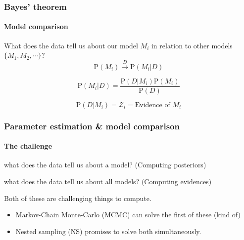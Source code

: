 \documentclass[]{beamer}
\newcommand{\ev}{\mathcal{Z}}
\newcommand{\prob}{\mathrm{P}}
\begin{document}
\begin{frame}
  \frametitle{Bayes' theorem}
  \framesubtitle{Model comparison}
  \pause
  What does the data tell us about our model $M_i$ in relation to other models $\{M_1,M_2,\cdots\}$?
  \pause
    \[\prob(M_i) \xrightarrow{D} \prob(M_i|D)\] 

    \pause
    \[\prob(M_i|D) = \frac{\prob(D|M_i) \prob(M_i) }{ \prob(D) }\] 

    \pause
    \[\prob(D|M_i) = \ev_i = \text{Evidence of $M_i$} \]
\end{frame}

\begin{frame}
  \frametitle{Parameter estimation \& model comparison} 
  \framesubtitle{The challenge}

  \begin{description}
      \pause
    \item[Parameter estimation:] what does the data tell us about a model? (Computing posteriors)
      \pause
    \item[Model comparison:] what does the data tell us about all models? (Computing evidences)
  \end{description}

  \pause
  Both of these are challenging things to compute.
  \begin{itemize}
      \pause
    \item Markov-Chain Monte-Carlo (MCMC) can solve the first of these (kind of)
      \pause
    \item Nested sampling (NS) promises to solve both simultaneously.
  \end{itemize}
 
\end{frame}
\end{document}
